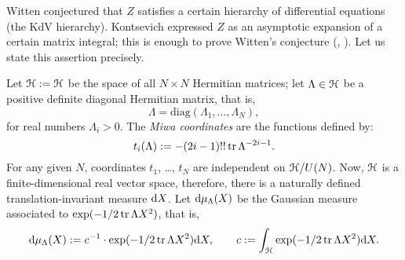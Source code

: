 Witten \cite{witten;intersection-theory} conjectured that $Z$ satisfies
a certain hierarchy of differential equations (the KdV hierarchy).
Kontsevich \cite{kontsevich;intersection-theory;1992} expressed $Z$ as
an asymptotic expansion of a certain matrix integral; this is enough
to prove Witten's conjecture
(\cite{kontsevich;intersection-theory;1992},
\cite{witten;kontsevich-model}). Let us state this assertion
precisely.

Let $\Hn := \Hermitian[N]$ be the space of all $N \times N$ Hermitian
matrices; let $\Lambda \in \Hn$ be a positive definite diagonal
Hermitian matrix, that is,
\begin{equation*}
  \Lambda = \text{diag}( \Lambda_1, \ldots, \Lambda_N ),
\end{equation*}
for real numbers $\Lambda_i > 0$. The \emph{Miwa coordinates} are the
functions defined by:
\begin{equation*}
  t_i (\Lambda) := -(2i-1)!! \tr \Lambda^{-2i-1}.
\end{equation*}
For any given $N$, coordinates $t_1$, \ldots, $t_N$ are independent on
$\Hermitian[N]/U(N)$. Now, $\Hn$ is a finite-dimensional real vector
space, therefore, there is a naturally defined translation-invariant
measure $\ud X$. Let $\ud\mu_\Lambda(X)$ be the Gaussian measure associated
to $\exp ( -1/2 \tr \Lambda X^2)$, that is,
\begin{equation*}
  \ud \mu_\Lambda(X) := c^{-1} \cdot \exp ( -1/2 \tr \Lambda X^2)
  \ud X, \qquad c := \int_\Hn  \exp ( -1/2 \tr \Lambda X^2) \ud X.
\end{equation*}

